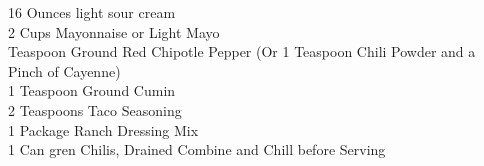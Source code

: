 {16 Ounces light sour cream \\
 2 Cups Mayonnaise or Light Mayo \\
  Teaspoon Ground Red Chipotle Pepper (Or 1 Teaspoon Chili Powder and a Pinch of Cayenne)\\
 1 Teaspoon Ground Cumin \\
 2 Teaspoons Taco Seasoning \\
 1 Package Ranch Dressing Mix \\
 1 Can gren Chilis, Drained}
{Combine and Chill before Serving}
